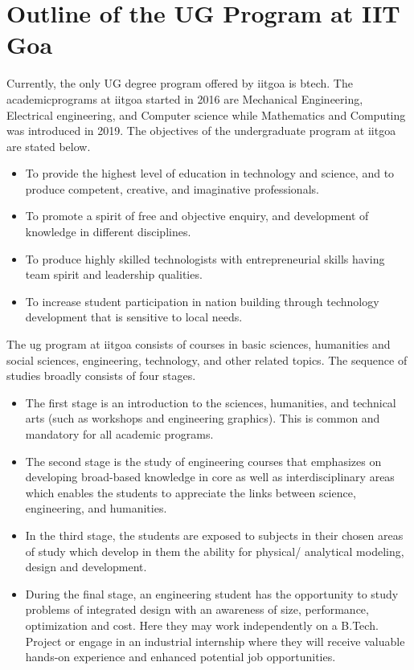 \section{Outline of the UG Program at IIT Goa}
	
Currently, the only UG degree program offered by \acrfull{iitgoa} is \acrfull{btech}. The \glspl{academicprogram} at \acrshort{iitgoa} started in 2016 are Mechanical Engineering, Electrical engineering, and Computer science while Mathematics and Computing was introduced in 2019. The objectives of the undergraduate program at \acrshort{iitgoa} are stated below.
	
\begin{itemize}[leftmargin=15mm]
	\item To provide the highest level of education in technology and science, and to produce competent, creative, and imaginative professionals.
	\item To promote a spirit of free and objective enquiry, and development of knowledge in different disciplines. 
	\item To produce highly skilled technologists with entrepreneurial skills having team spirit and leadership qualities. 
	\item To increase student participation in nation building through technology development that is sensitive to local needs.
\end{itemize}
	 
The \acrshort{ug} program at \acrshort{iitgoa} consists of courses in basic sciences, humanities and social sciences, engineering, technology, and other related topics. The sequence of studies broadly consists of four stages.
	
\begin{itemize}[leftmargin=15mm]
	\item The first stage is an introduction to the sciences, humanities, and technical arts (such as workshops and engineering graphics). This is common and mandatory for all academic programs. 
	\item The second stage is the study of engineering courses that emphasizes on developing broad-based knowledge in core as well as interdisciplinary areas which enables the students to appreciate the links between science, engineering, and humanities. 
	\item In the third stage, the students are exposed to subjects in their chosen areas of study which develop in them the ability for physical/ analytical modeling, design and development. 
	\item During the final stage, an engineering student has the opportunity to study problems of integrated design with an awareness of size, performance, optimization and cost. Here they may work independently on a B.Tech. Project or engage in an industrial internship where they will receive valuable hands-on experience and enhanced potential job opportunities.
\end{itemize}

